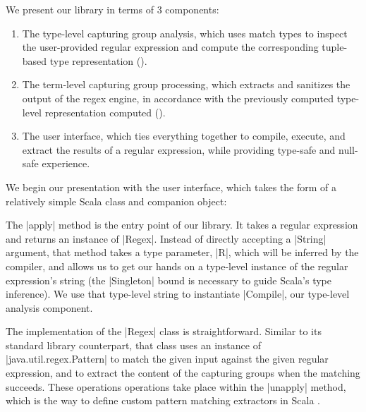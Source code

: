 We present our library in terms of 3 components:

\begin{enumerate}
  \item The type-level capturing group analysis, which uses match types to inspect the user-provided regular expression and compute the corresponding tuple-based type representation ().

  \item The term-level capturing group processing, which extracts and sanitizes the output of the regex engine, in accordance with the previously computed type-level representation computed ().

  \item The user interface, which ties everything together to compile, execute, and extract the results of a regular expression, while providing type-safe and null-safe experience.
\end{enumerate}

We begin our presentation with the user interface, which takes the form of a relatively simple Scala class and companion object:

\regexUserLevel
%

The |apply| method is the entry point of our library.
It takes a regular expression and returns an instance of |Regex|.
Instead of directly accepting a |String| argument, that method takes a type parameter, |R|, which will be inferred by the compiler, and allows us to get our hands on a type-level instance of the regular expression's string (the |Singleton| bound is necessary to guide Scala's type inference).
We use that type-level string to instantiate |Compile|, our type-level analysis component.

The implementation of the |Regex| class is straightforward.
Similar to its standard library counterpart, that class uses an instance of |java.util.regex.Pattern| to match the given input against the given regular expression, and to extract the content of the capturing groups when the matching succeeds.
These operations operations take place within the |unapply| method, which is the way to define custom pattern matching extractors in Scala \citep{emir2007matching}.

